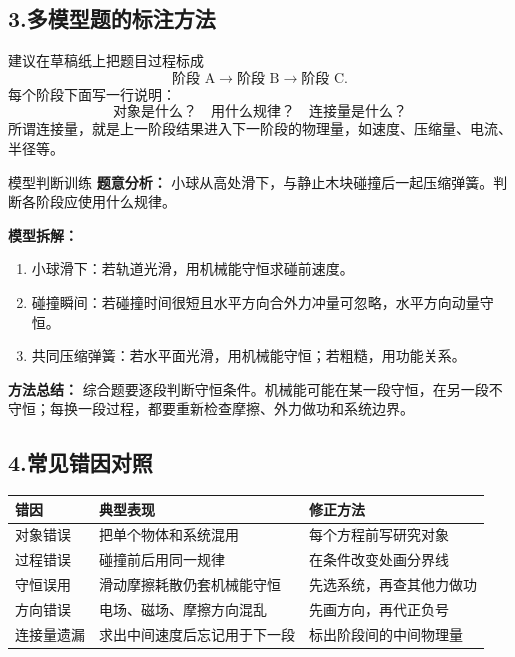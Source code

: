 \subsection*{3.\quad 多模型题的标注方法}

建议在草稿纸上把题目过程标成
\[
\text{阶段 A}\rightarrow\text{阶段 B}\rightarrow\text{阶段 C}.
\]
每个阶段下面写一行说明：
\[
\text{对象是什么？}\quad \text{用什么规律？}\quad \text{连接量是什么？}
\]
所谓连接量，就是上一阶段结果进入下一阶段的物理量，如速度、压缩量、电流、半径等。

\begin{examplebox}{模型判断训练}
\textbf{题意分析：} 小球从高处滑下，与静止木块碰撞后一起压缩弹簧。判断各阶段应使用什么规律。

\textbf{模型拆解：}
\begin{enumerate}
  \item 小球滑下：若轨道光滑，用机械能守恒求碰前速度。
  \item 碰撞瞬间：若碰撞时间很短且水平方向合外力冲量可忽略，水平方向动量守恒。
  \item 共同压缩弹簧：若水平面光滑，用机械能守恒；若粗糙，用功能关系。
\end{enumerate}

\textbf{方法总结：} 综合题要逐段判断守恒条件。机械能可能在某一段守恒，在另一段不守恒；每换一段过程，都要重新检查摩擦、外力做功和系统边界。
\end{examplebox}

\subsection*{4.\quad 常见错因对照}

\begin{center}
\begin{tabular}{lll}
\toprule
错因 & 典型表现 & 修正方法 \\
\midrule
对象错误 & 把单个物体和系统混用 & 每个方程前写研究对象 \\
过程错误 & 碰撞前后用同一规律 & 在条件改变处画分界线 \\
守恒误用 & 滑动摩擦耗散仍套机械能守恒 & 先选系统，再查其他力做功 \\
方向错误 & 电场、磁场、摩擦方向混乱 & 先画方向，再代正负号 \\
连接量遗漏 & 求出中间速度后忘记用于下一段 & 标出阶段间的中间物理量 \\
\bottomrule
\end{tabular}
\end{center}

